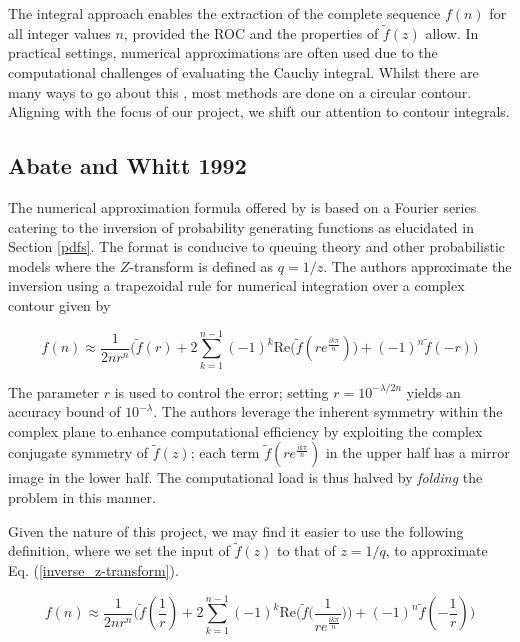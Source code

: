 \documentclass[a4paper]{report}
\begin{document}
The integral approach enables the extraction of the complete sequence $f(n)$ for all integer values $n$, provided the ROC and the properties of $\tilde{f}(z)$ allow. In practical settings, numerical approximations are often used due to the computational challenges of evaluating the Cauchy integral. Whilst there are many ways to go about this \citep{merrikh2014linearsys, rajkovic2004method, horvath2020numerical}, most methods are done on a circular contour. Aligning with the focus of our project, we shift our attention to contour integrals.

\subsection{Abate and Whitt 1992}\label{section:abate_whitt}
The numerical approximation formula offered by \citet{AbateWhitt1992a, AbateWhitt1992b} is based on a Fourier series catering to the inversion of probability generating functions as elucidated in Section \ref{pdfs}. The format is conducive to queuing theory and other probabilistic models where the $Z$-transform is defined as $q = 1 / z$. The authors approximate the inversion using a trapezoidal rule for numerical integration over a complex contour given by

\begin{equation}\label{aw_inversion_original}
	f(n) \approx \frac{1}{2nr^n} \biggr( \tilde{f}(r) + 2\sum^{n-1}_{k = 1} (-1)^k \mathrm{Re}\bigg( \tilde{f}(re^{\frac{ik\pi}{n}})\bigg) + (-1)^n\tilde{f}(-r) \biggl)
\end{equation}

The parameter $r$ is used to control the error; setting $r = 10^{-\lambda / 2n}$ yields an accuracy bound of $10^{-\lambda}$. The authors leverage the inherent symmetry within the complex plane to enhance computational efficiency by exploiting the complex conjugate symmetry of $\tilde{f}(z)$; each term $\tilde{f}(re^{\frac{ik\pi}{n}})$ in the upper half has a mirror image in the lower half. The computational load is thus halved by \textit{folding} the problem in this manner.

Given the nature of this project, we may find it easier to use the following definition, where we set the input of $\tilde{f}(z)$ to that of $z = 1 / q$, to approximate Eq. (\ref{inverse_z-transform}).

\begin{equation}\label{eq:aw_inversion}
	f(n) \approx \frac{1}{2nr^n} \biggr( \tilde{f}(\frac{1}{r}) + 2\sum^{n-1}_{k = 1} (-1)^k \text{Re}\bigg( \tilde{f}\big(\frac{1}{re^{\frac{ik\pi}{n}}}\big)\bigg) + (-1)^n\tilde{f}(-\frac{1}{r}) \biggl)
\end{equation}
\end{document}

